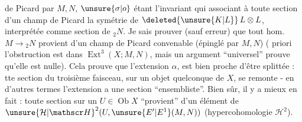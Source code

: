  de Picard  par $M,N$, $\unsure{\sigma|o}$ étant l'invariant qui  associant à toute section  d'un champ de Picard la symétrie de $\deleted{\unsure{K|L}}\,L\otimes L$, interprétée comme section de ${}_{2}N$. Je sais prouver (sauf erreur) que tout hom. $M\to{}_{2}N$ provient d'un champ de Picard convenable (épinglé par $M,N$) ( priori l'obstruction est dans $\operatorname{Ext}^{3}(X;M,N)$, mais un argument ``universel'' prouve qu'elle est nulle). Cela prouve que l'extension $\alpha$, est bien proche d'être splittée : tte section du troisième faisceau, sur un objet quelconque de $X$, se remonte - en d'autres termes l'extension a une section ``ensembliste''. Bien sûr, il y a mieux en fait : toute section sur un $U\in\operatorname{Ob}X$ ``provient'' d'un élément de ${\unsure{\mathcal H|\mathscr H}}^{2}(U,\unsure{E'|E^{1}}(M,N))$ (hypercohomologie $\mathcal H^{2}$).
